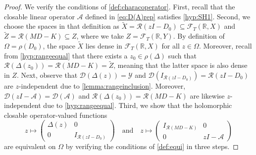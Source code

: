 \documentclass[english]{myarticle}
\begin{document}
\begin{sloppypar}
\begin{proof}
We verify the conditions of \cref{def:characoperator}. First, recall that the closable linear operator $\mathcal{A}$ defined in \eqref{eq:D(A)rep} satisfies \ref{hyp:SH1}. Second, we choose the spaces in that definition as $\tilde{X} = \mathcal{R}(zI - D_0) \subseteq \mathcal{F}_T(\mathbb{R}, X)$ and $\tilde{Z} = \mathcal{R}(MD -K) \subseteq Z$, where we take $Z = \mathcal{F}_T(\mathbb{R}, Y)$. By definition of $\Omega = \mathcal{\rho}(D_0)$, the space $\tilde{X}$ lies dense in $\mathcal{F}_T(\mathbb{R}, X)$ for all $z \in \Omega$. Moreover, recall from \ref{hyp:rangeequal} that there exists a $z_0 \in \rho(\Delta)$ such that $\mathcal{R}(\Delta(z_0)) = \mathcal{R}(MD-K) = \tilde{Z}$, meaning that the latter space is also dense in $Z$. Next, observe that $\mathcal{D}(\Delta(z)) = \mathcal{Y}$ and $\mathcal{D}(I_{\mathcal{R}(zI - D_0)}) = \mathcal{R}(zI - D_0)$ are $z$-independent due to \cref{lemma:rangeinclusion}. Moreover, $\mathcal{D}(zI - \mathcal{A}) = \mathcal{D}(\mathcal{A})$ and $\mathcal{R}(\Delta(z_0)) = \mathcal{R}(MD - K)$ are likewise $z$-independent due to \ref{hyp:rangeequal}. Third, we show that the holomorphic closable operator-valued functions
\begin{equation*}
    z \mapsto 
    \begin{pmatrix}
        \Delta(z) & 0 \\
        0 & I_{\mathcal{R}(zI - D_0)}
    \end{pmatrix}
    \quad \text{and} \quad
    z \mapsto
    \begin{pmatrix}
        I_{\mathcal{R}(MD - K)} & 0 \\
        0 & zI - \mathcal{A}
    \end{pmatrix}
\end{equation*}
are equivalent on $\Omega$ by verifying the conditions of \cref{def:equi} in three steps.


\end{proof}
\end{sloppypar}
\end{document}
